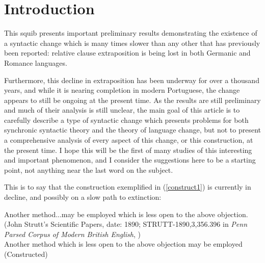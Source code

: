 \section{Introduction}
\label{intro}
This squib presents important preliminary results demonstrating the existence of a syntactic change which is many times slower than any other that has previously been reported: relative clause extraposition is being lost in both Germanic and Romance languages.

Furthermore, this decline in extraposition has been underway for over a thousand years, and while it is nearing completion in modern Portuguese, the change appears to still be ongoing at the present time.
As the results are still preliminary and much of their analysis is still unclear, the main goal of this article is to carefully describe a type of syntactic change which presents problems for both synchronic syntactic theory and the theory of language change, but not to present a comprehensive analysis of every aspect of this change, or this construction, at the present time. I hope this will be the first of many studies of this interesting and important phenomenon, and I consider the suggestions here to be a starting point, not anything near the last word on the subject.

This is to say that the construction exemplified in (\ref{construct1}) is currently in decline, and possibly on a slow path to extinction:

\begin{exe}
    \ex %
    \begin{xlist}
         \ex \label{construct1} Another method...may be employed which is less open to the above objection.\\
         (John Strutt's Scientific Papers, date: 1890; STRUTT-1890,3,356.396 in \textsl{Penn Parsed Corpus of Modern British English}, \citealt{ppcmbe})\\
         \ex \label{construct2} Another method which is less open to the above objection may be employed\\
         (Constructed)
        \end{xlist}
\end{exe}

